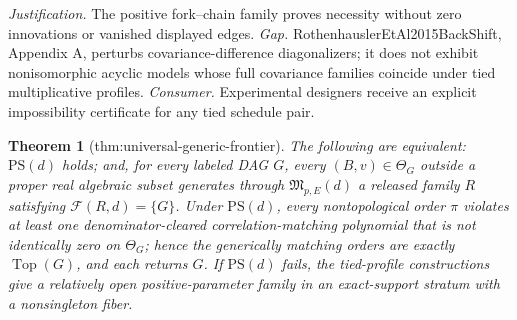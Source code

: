 \documentclass{article}
\newtheorem{theorem}{Theorem}
\begin{document}
\par\smallskip\noindent \textit{Justification.} The positive fork--chain family proves necessity without zero innovations or vanished displayed edges. \textit{Gap.} RothenhauslerEtAl2015BackShift, Appendix A, perturbs covariance-difference diagonalizers; it does not exhibit nonisomorphic acyclic models whose full covariance families coincide under tied multiplicative profiles. \textit{Consumer.} Experimental designers receive an explicit impossibility certificate for any tied schedule pair.

\begin{theorem}[thm:universal-generic-frontier]\label{thm:universal-generic-frontier}
The following are equivalent: \(\mathrm{PS}(d)\) holds; and, for every labeled DAG \(G\), every \((B,v)\in\Theta_G\) outside a proper real algebraic subset generates through \(\mathfrak M_{p,E}(d)\) a released family \(R\) satisfying \(\mathcal F(R,d)=\{G\}\). Under \(\mathrm{PS}(d)\), every nontopological order \(\pi\) violates at least one denominator-cleared correlation-matching polynomial that is not identically zero on \(\Theta_G\); hence the generically matching orders are exactly \(\operatorname{Top}(G)\), and each returns \(G\). If \(\mathrm{PS}(d)\) fails, the tied-profile constructions give a relatively open positive-parameter family in an exact-support stratum with a nonsingleton fiber.
\end{theorem}
\end{document}
